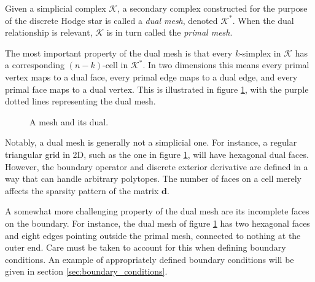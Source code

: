 \documentclass[utf8,english]{gradu3}
\begin{document}
Given a simplicial complex $\mathcal{K}$,
a secondary complex constructed for the purpose of the discrete Hodge star
is called a \textit{dual mesh}, denoted $\mathcal{K}^*$.
When the dual relationship is relevant,
$\mathcal{K}$ is in turn called the \textit{primal mesh}.

The most important property of the dual mesh
is that every $k$-simplex in $\mathcal{K}$
has a corresponding $(n-k)$-cell in $\mathcal{K}^*$.
In two dimensions this means every primal vertex maps to a dual face,
every primal edge maps to a dual edge, and every primal face maps to a dual vertex.
This is illustrated in figure \ref{fig:dual_mesh},
with the purple dotted lines representing the dual mesh.

\begin{figure}[h]
  \centering
  \caption{A mesh and its dual.}
  \label{fig:dual_mesh}
\end{figure}

Notably, a dual mesh is generally not a simplicial one.
For instance, a regular triangular grid in 2D,
such as the one in figure \ref{fig:dual_mesh}, will have hexagonal dual faces.
However, the boundary operator and discrete exterior derivative
are defined in a way that can handle arbitrary polytopes.
The number of faces on a cell merely affects the sparsity pattern
of the matrix $\mathbf{d}$.

A somewhat more challenging property of the dual mesh
are its incomplete faces on the boundary.
For instance, the dual mesh of figure \ref{fig:dual_mesh} has two hexagonal faces
and eight edges pointing outside the primal mesh, connected to nothing at the outer end.
Care must be taken to account for this when defining boundary conditions.
An example of appropriately defined boundary conditions
will be given in section \ref{sec:boundary_conditions}.
\end{document}
